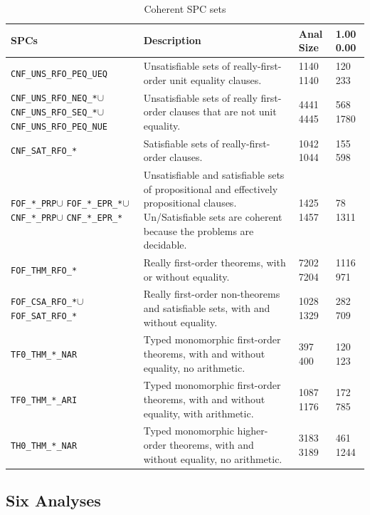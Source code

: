 \documentclass[runningheads]{llncs}
\begin{document}
\begin{table}[h!]
\renewcommand{\arraystretch}{1.5}
\center
\begin{tabular}{p{3.5cm}|p{6.5cm}|R{0.7cm}R{0.7cm}}
\hline
SPCs & Description & Anal Size & 1.00 0.00 \\
\hline
{\tt CNF\_UNS\_RFO\_PEQ\_UEQ} &
Unsatisfiable sets of really-first-order unit equality clauses.
& 1140 1140 & 120 233 \\
{\tt CNF\_UNS\_RFO\_NEQ\_*}\enspace$\cup$ {\tt CNF\_UNS\_RFO\_SEQ\_*}\enspace$\cup$
{\tt CNF\_UNS\_RFO\_PEQ\_NUE} &
Unsatisfiable sets of really first-order clauses that are not unit equality.
& 4441 4445 & 568 1780 \\
{\tt CNF\_SAT\_RFO\_*} &
Satisfiable sets of really-first-order clauses.
& 1042 1044 & 155 598 \\
{\tt FOF\_*\_PRP}\enspace$\cup$ {\tt FOF\_*\_EPR\_*}\enspace$\cup$
{\tt CNF\_*\_PRP}\enspace$\cup$ {\tt CNF\_*\_EPR\_*} &
Unsatisfiable and satisfiable sets of propositional and effectively propositional clauses.
Un/Satisfiable sets are coherent because the problems are decidable.
& 1425 1457 & 78 1311 \\
{\tt FOF\_THM\_RFO\_*} &
Really first-order theorems, with or without equality.
& 7202 7204 & 1116 971 \\
{\tt FOF\_CSA\_RFO\_*}\enspace$\cup$ {\tt FOF\_SAT\_RFO\_*} &
Really first-order non-theorems and satisfiable sets, with and without equality.
& 1028 1329 & 282 709 \\
{\tt TF0\_THM\_*\_NAR} &
Typed monomorphic first-order theorems, with and without equality, no arithmetic.
& 397 400 & 120 123 \\
{\tt TF0\_THM\_*\_ARI} &
Typed monomorphic first-order theorems, with and without equality, with arithmetic.
& 1087 1176 & 172 785 \\
{\tt TH0\_THM\_*\_NAR} &
Typed monomorphic higher-order theorems, with and without equality, no arithmetic.
& 3183 3189 & 461 1244 \\
\hline
\end{tabular}
\vspace*{0.5em}
\caption{Coherent SPC sets}
\label{SPCSetsTable}
\end{table}

\subsection{Six Analyses}
\label{AnalysisTypes}
\end{document}
